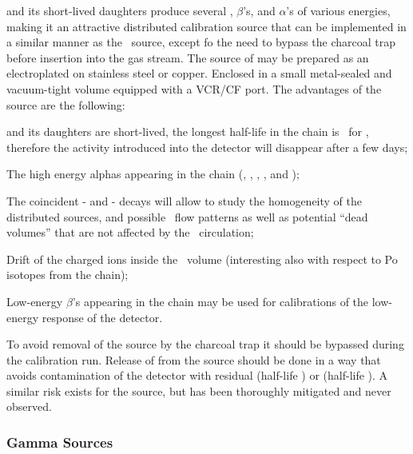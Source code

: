  and its short-lived daughters produce several \grs, $\beta$'s, and $\alpha$'s of various energies, making it an attractive distributed calibration source that can be implemented in a similar manner as the \Kr\ source, except fo the need to bypass the charcoal trap before insertion into the gas stream.  The source of  may be prepared as an electroplated  on stainless steel or copper.  Enclosed in a small metal-sealed and vacuum-tight volume equipped with a VCR/CF port.  The advantages of the  source are the following:

\begin{compactitem}
\item {} and its daughters are short-lived, the longest half-life in the chain is \BiTwoOneTwoHalfLife\ for , therefore the activity introduced into the detector will disappear after a few days;
\item The high energy alphas appearing in the chain (\BiTwoOneTwoAlphaTwoEnergy, \BiTwoOneTwoAlphaOneEnergy, \RnTwoTwoZeroAlphaEnergy, \PoTwoOneSixAlphaEnergy, and \PoTwoOneTwoAlphaEnergy);
\item The coincident - and - decays will allow to study the homogeneity of the distributed sources, and possible \LAr\ flow patterns as well as potential ``dead volumes'' that are not affected by the \LAr\ circulation;
\item Drift of the charged ions inside the \LAr\ volume (interesting also with respect to Po isotopes from the  chain);
\item Low-energy $\beta$'s appearing in the chain may be used for calibrations of the low-energy response of the detector.
\end{compactitem}

To avoid removal of the  source by the charcoal trap it should be bypassed during the calibration run.  Release of  from the source should be done in a way that avoids contamination of the detector with residual  (half-life \RaTwoTwoFourHalfLife) or  (half-life \ThTwoTwoEightHalfLife).  A similar risk exists for the  source, but has been thoroughly mitigated and never observed.


\subsubsection{Gamma Sources}

